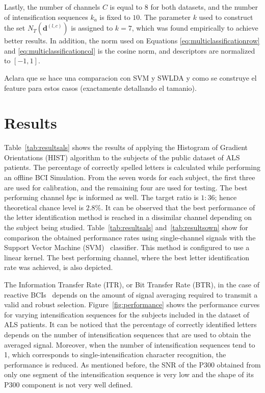 \documentclass[utf8]{frontiersSCNS} %
\begin{document}
Lastly, the number of channels $C$ is equal to $8$ for both datasets, and the number of intensification sequences $k_a$ is fixed to $10$.  The parameter $k$ used to construct the set $N_T(\mathbf{d}^{(l,c)})$ is assigned to $k=7$, which was found empirically to achieve better results.  In addition, the norm used on  Equations \ref{eq:multiclassificationrow} and \ref{eq:multiclassificationcol} is the cosine norm, and descriptors are normalized to $ \left[ -1, 1 \right] $.

Aclara que se hace una comparacion con SVM y SWLDA y como se construye el feature para estos casos (exactamente detallando el tamanio).


\section{Results} \label{Results}
\label{section:results}

Table~\ref{tab:resultsals} shows the results of applying the Histogram of Gradient Orientations (HIST) algorithm to the subjects of the public dataset of ALS patients. The percentage of correctly spelled letters is calculated while performing an offline BCI Simulation.  From the seven words for each subject, the first three are used for calibration, and the remaining four are used for testing.  The best performing channel  $bpc$ is informed as well. The target ratio is $1:36$; hence theoretical chance level is $2.8\%$. It can be observed that the best performance of the letter identification method is reached in a dissimilar channel depending on the subject being studied.  Table~\ref{tab:resultsals} and~\ref{tab:resultsown} show for comparison the obtained performance rates using single-channel signals with the Support Vector Machine (SVM)~\citep{Scholkopf2001} classifier.  This method is configured to use a linear kernel.  The best performing channel, where the best letter identification rate was achieved, is also depicted.


The Information Transfer Rate (ITR), or Bit Transfer Rate (BTR), in the case of reactive BCIs~\citep{WolpawJonathanR2012}  depends on the amount of signal averaging required to transmit a valid and robust selection.  Figure~\ref{fig:performance} shows the performance curves for varying intensification sequences for the subjects included in the dataset of ALS patients. It can be noticed that the percentage of correctly identified letters depends on the number of intensification sequences that are used to obtain the averaged signal.  Moreover, when the number of intensification sequences tend to 1, which corresponds to single-intensification character recognition, the performance is reduced. As mentioned before, the SNR of the P300 obtained from only one segment of the intensification sequence is very low and the shape of its P300 component is not very well defined.
\end{document}
